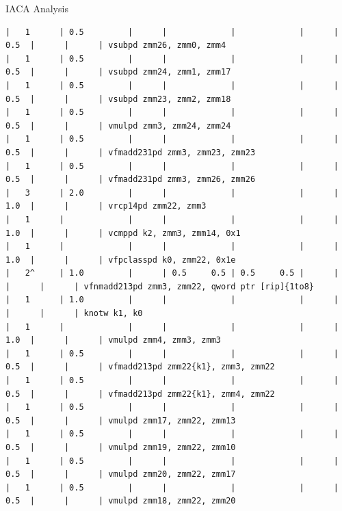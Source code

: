 \documentclass[aspectratio=169,t]{beamer}
\begin{document}
\begin{frame}[fragile]{IACA Analysis}
\begin{lstlisting}[basicstyle=\tt\fontsize{4pt}{6pt}\selectfont]
|   1      | 0.5         |      |             |             |      | 0.5  |      |      | vsubpd zmm26, zmm0, zmm4
|   1      | 0.5         |      |             |             |      | 0.5  |      |      | vsubpd zmm24, zmm1, zmm17
|   1      | 0.5         |      |             |             |      | 0.5  |      |      | vsubpd zmm23, zmm2, zmm18
|   1      | 0.5         |      |             |             |      | 0.5  |      |      | vmulpd zmm3, zmm24, zmm24
|   1      | 0.5         |      |             |             |      | 0.5  |      |      | vfmadd231pd zmm3, zmm23, zmm23
|   1      | 0.5         |      |             |             |      | 0.5  |      |      | vfmadd231pd zmm3, zmm26, zmm26
|   3      | 2.0         |      |             |             |      | 1.0  |      |      | vrcp14pd zmm22, zmm3
|   1      |             |      |             |             |      | 1.0  |      |      | vcmppd k2, zmm3, zmm14, 0x1
|   1      |             |      |             |             |      | 1.0  |      |      | vfpclasspd k0, zmm22, 0x1e
|   2^     | 1.0         |      | 0.5     0.5 | 0.5     0.5 |      |      |      |      | vfnmadd213pd zmm3, zmm22, qword ptr [rip]{1to8}
|   1      | 1.0         |      |             |             |      |      |      |      | knotw k1, k0
|   1      |             |      |             |             |      | 1.0  |      |      | vmulpd zmm4, zmm3, zmm3
|   1      | 0.5         |      |             |             |      | 0.5  |      |      | vfmadd213pd zmm22{k1}, zmm3, zmm22
|   1      | 0.5         |      |             |             |      | 0.5  |      |      | vfmadd213pd zmm22{k1}, zmm4, zmm22
|   1      | 0.5         |      |             |             |      | 0.5  |      |      | vmulpd zmm17, zmm22, zmm13
|   1      | 0.5         |      |             |             |      | 0.5  |      |      | vmulpd zmm19, zmm22, zmm10
|   1      | 0.5         |      |             |             |      | 0.5  |      |      | vmulpd zmm20, zmm22, zmm17
|   1      | 0.5         |      |             |             |      | 0.5  |      |      | vmulpd zmm18, zmm22, zmm20
    \end{lstlisting}
  \end{frame}
\end{document}

